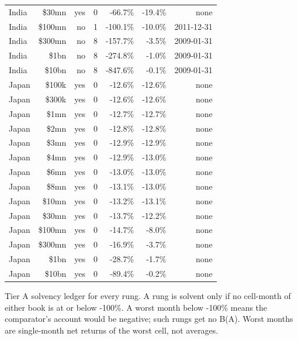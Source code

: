 \begin{table}[t]
\begin{tabular}{lrrrrrr}
India & \$30mn & yes & 0 & -66.7\% & -19.4\% & none \\
India & \$100mn & no & 1 & -100.1\% & -10.0\% & 2011-12-31 \\
India & \$300mn & no & 8 & -157.7\% & -3.5\% & 2009-01-31 \\
India & \$1bn & no & 8 & -274.8\% & -1.0\% & 2009-01-31 \\
India & \$10bn & no & 8 & -847.6\% & -0.1\% & 2009-01-31 \\
Japan & \$100k & yes & 0 & -12.6\% & -12.6\% & none \\
Japan & \$300k & yes & 0 & -12.6\% & -12.6\% & none \\
Japan & \$1mn & yes & 0 & -12.7\% & -12.7\% & none \\
Japan & \$2mn & yes & 0 & -12.8\% & -12.8\% & none \\
Japan & \$3mn & yes & 0 & -12.9\% & -12.9\% & none \\
Japan & \$4mn & yes & 0 & -12.9\% & -13.0\% & none \\
Japan & \$6mn & yes & 0 & -13.0\% & -13.0\% & none \\
Japan & \$8mn & yes & 0 & -13.1\% & -13.0\% & none \\
Japan & \$10mn & yes & 0 & -13.2\% & -13.1\% & none \\
Japan & \$30mn & yes & 0 & -13.7\% & -12.2\% & none \\
Japan & \$100mn & yes & 0 & -14.7\% & -8.0\% & none \\
Japan & \$300mn & yes & 0 & -16.9\% & -3.7\% & none \\
Japan & \$1bn & yes & 0 & -28.7\% & -1.7\% & none \\
Japan & \$10bn & yes & 0 & -89.4\% & -0.2\% & none \\
\bottomrule
\end{tabular}
\par\vspace{2pt}
\parbox{\textwidth}{\footnotesize Tier A solvency ledger for every rung. A rung is solvent only if no cell-month of either book is at or below -100\%. A worst month below -100\% means the comparator's account would be negative; such rungs get no B(A). Worst months are single-month net returns of the worst cell, not averages.}
\end{table}
